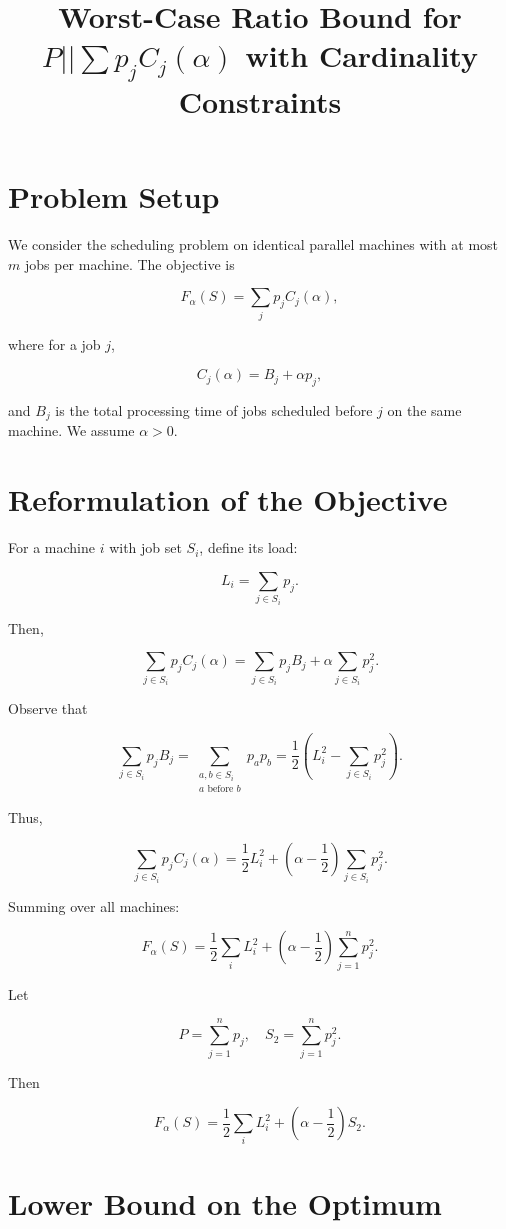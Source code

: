 \documentclass[11pt]{article}
\title{Worst-Case Ratio Bound for $P||\sum p_j C_j(\alpha)$ with Cardinality Constraints}
\author{}
\date{}
\begin{document}
\maketitle

\section*{Problem Setup}

We consider the scheduling problem on identical parallel machines with at most $m$ jobs per machine. The objective is

\[
F_\alpha(S) = \sum_j p_j C_j(\alpha),
\]

where for a job $j$,

\[
C_j(\alpha) = B_j + \alpha p_j,
\]

and $B_j$ is the total processing time of jobs scheduled before $j$ on the same machine. We assume $\alpha > 0$.

\section*{Reformulation of the Objective}

For a machine $i$ with job set $S_i$, define its load:

\[
L_i = \sum_{j \in S_i} p_j.
\]

Then,

\[
\sum_{j \in S_i} p_j C_j(\alpha)
= \sum_{j \in S_i} p_j B_j + \alpha \sum_{j \in S_i} p_j^2.
\]

Observe that

\[
\sum_{j \in S_i} p_j B_j
= \sum_{\substack{a,b \in S_i \\ a \text{ before } b}} p_a p_b
= \frac{1}{2}\left(L_i^2 - \sum_{j \in S_i} p_j^2\right).
\]

Thus,

\[
\sum_{j \in S_i} p_j C_j(\alpha)
= \frac{1}{2} L_i^2 + \left(\alpha - \frac{1}{2}\right)\sum_{j \in S_i} p_j^2.
\]

Summing over all machines:

\[
F_\alpha(S)
= \frac{1}{2} \sum_i L_i^2 + \left(\alpha - \frac{1}{2}\right)\sum_{j=1}^n p_j^2.
\]

Let

\[
P = \sum_{j=1}^n p_j, \quad S_2 = \sum_{j=1}^n p_j^2.
\]

Then

\[
F_\alpha(S)
= \frac{1}{2} \sum_i L_i^2 + \left(\alpha - \frac{1}{2}\right) S_2.
\]

\section*{Lower Bound on the Optimum}
\end{document}
